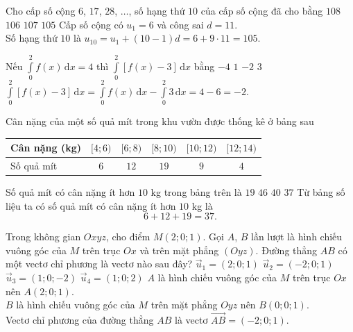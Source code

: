 \begin{ex}%
	Cho cấp số cộng $6$, $17$, $28$, $\ldots$, số hạng thứ $10$ của cấp số cộng đã cho bằng
	\choice
	{$108$}
	{$106$}
	{$107$}
	{\True $105$}
	\loigiai
	{
		Cấp số cộng có $u_1=6$ và công sai $d=11$.\\
		Số hạng thứ $10$ là $u_{10}=u_1+(10-1)d=6+9\cdot 11=105$.
	}
\end{ex}

\begin{ex}%
	Nếu $\displaystyle\int\limits_0^2f(x)\mathrm{\, d}x=4$ thì $\displaystyle\int\limits_0^2\left[f(x)-3\right]\mathrm{\, d}x$ bằng
	\choice
	{$-4$}
	{$1$}
	{\True $-2$}
	{$3$}
	\loigiai
	{
		$\displaystyle\int\limits_0^2\left[f(x)-3\right]\mathrm{\, d}x=\displaystyle\int\limits_0^2f(x)\mathrm{\, d}x-\displaystyle\int\limits_0^2 3\mathrm{\, d}x=4-6=-2$.
	}
\end{ex}

\begin{ex}%
	Cân nặng của một số quả mít trong khu vườn được thống kê ở bảng sau
	\begin{center}
		\begin{tabular}{|l|c|c|c|c|c|}
			\hline Cân nặng (kg)&{$[4;6)$}&{$[6;8)$}&{$[8;10)$}&{$[10;12)$}&{$[12;14)$}\\
			\hline Số quả mít&$6$&$12$&$19$&$9$&$4$\\
			\hline
		\end{tabular}
	\end{center}
	Số quả mít có cân nặng ít hơn $10$ kg trong bảng trên là
	\choice
	{$19$}
	{$46$}
	{$40$}
	{\True $37$}
	\loigiai
	{
		Từ bảng số liệu ta có số quả mít có cân nặng ít hơn $10$ kg là $$6+12+19=37.$$
	}
\end{ex}

\begin{ex}%
	Trong không gian $Oxyz$, cho điểm $M(2;0;1)$. Gọi $A$, $B$ lần lượt là hình chiếu vuông góc của $M$ trên trục $O x$ và trên mặt phẳng $(Oyz)$. Đường thẳng $AB$ có một vectơ chỉ phương là vectơ nào sau đây?
	\choice
	{$\vec{u}_1=(2;0;1)$}
	{\True $\vec{u}_2=(-2;0;1)$}
	{$\vec{u}_3=(1;0;-2)$}
	{$\vec{u}_4=(1;0;2)$}
	\loigiai
	{
		$A$ là hình chiếu vuông góc của $M$ trên trục $Ox$ nên $A(2;0;1)$.\\
		$B$ là hình chiếu vuông góc của $M$ trên mặt phẳng $Oyz$ nên $B(0;0;1)$.\\
		Vectơ chỉ phương của đường thẳng $AB$ là vectơ $\overrightarrow{AB}=(-2;0;1)$.
	}
\end{ex}

